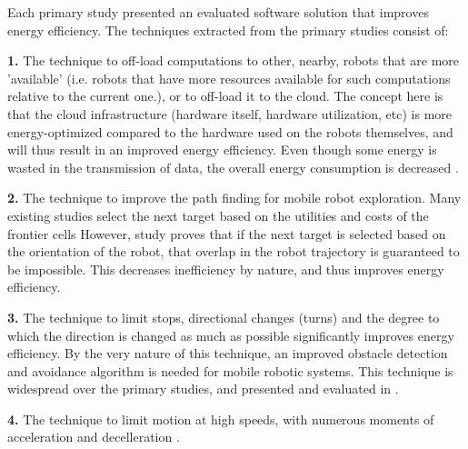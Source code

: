 Each primary study presented an evaluated software solution that improves energy efficiency.
The techniques extracted from the primary studies consist of:

\vspace{2mm}

\textbf{1.} The technique to off-load computations to other, nearby, robots that are more 'available' 
(i.e. robots that have more resources available for such computations relative to the current one.), or to off-load it to the cloud.
The concept here is that the cloud infrastructure (hardware itself, hardware utilization, etc) is more energy-optimized compared to the
hardware used on the robots themselves, and will thus result in an improved energy efficiency.
Even though some energy is wasted in the transmission of data, the overall energy consumption is decreased \cite{rahman2019cloud_robot_offloading}.
    
\vspace{2mm}

\textbf{2.} The technique to improve the path finding for mobile robot exploration. 
Many existing studies select the next target based on the utilities and costs of the frontier cells 
\cite{burgard2005multi_robot_exploration, simmons2000multi_robot_exploration,zlot2002multi_robot_exploration} 
However, study \cite{mei2006mobile_exploration} proves that if the next target is selected based on the orientation of the robot, 
that overlap in the robot trajectory is guaranteed to be impossible. This decreases inefficiency by nature, and thus improves energy 
efficiency.
    
\vspace{2mm}

\textbf{3.} The technique to limit stops, directional changes (turns) and the degree to which the direction is changed as much as possible 
significantly improves energy efficiency. By the very nature of this technique, an improved obstacle detection and avoidance algorithm
is needed for mobile robotic systems. This technique is widespread over the primary studies, and presented and evaluated in 
\cite{xie2018mecanum_wheel, kim2016firefighting_robot, benkrid2016multi_robot_exploration, barili1995efficient_motion, 
jia2004grid_strategy_exploration, mei2005energy_consumers_identified, patel2012exploration_strategy}.
    
\vspace{2mm}

\textbf{4.} The technique to limit motion at high speeds, with numerous moments of acceleration and decelleration
\cite{wingstrom2013robot_cell_scheduling}.
    
